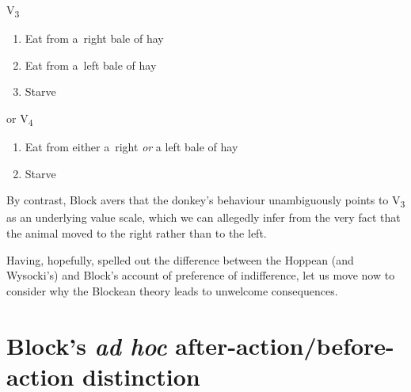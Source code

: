 V\textsubscript{3}



\begin{enumerate}

\item Eat from a~right bale of hay

\item Eat from a~left bale of hay

\item Starve

\end{enumerate}

or V\textsubscript{4}



\begin{enumerate}

\item Eat from either a~right \textit{or} a left bale of hay

\item Starve

\end{enumerate}

By contrast, Block avers that the donkey's behaviour unambiguously points to V\textsubscript{3} as an underlying value scale, which we can allegedly infer from the very fact that the animal moved to the right rather than to the left.



Having, hopefully, spelled out the difference between the Hoppean (and Wysocki's) and Block's account of preference of indifference, let us move now to consider why the Blockean theory leads to unwelcome consequences.



\section{Block's \textit{ad hoc} after-action/before-action distinction }

